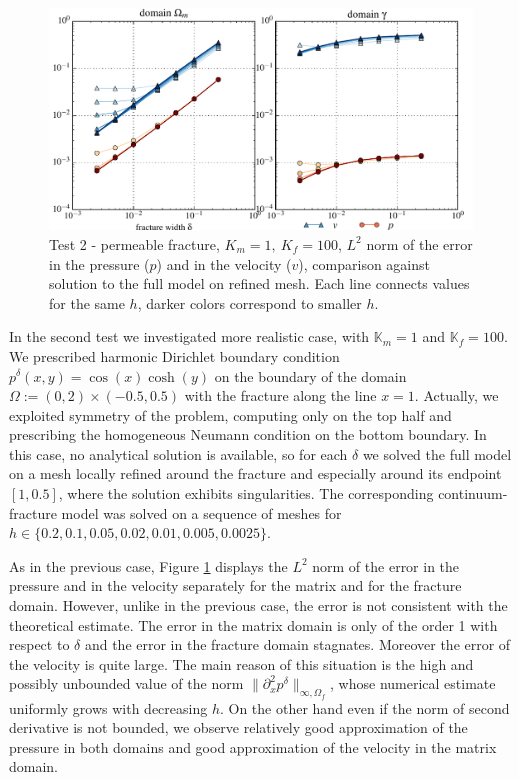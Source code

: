 \documentclass{llncs}
\def\prtl{\partial}
\def\tn#1{{\mathbb{#1}}}    %
\def\norm#1{\|#1\|}
\begin{document}
\begin{figure}
\centering
\includegraphics[scale=0.6]{figures/plot_num_cos_cosh_color.pdf}
\caption{Test 2 - permeable fracture, $K_m=1,\ K_f=100$, $L^2$ norm of the error in the pressure ($p$) and in the velocity ($v$), 
         comparison against solution to the full model on refined mesh.
         Each line connects values for the same $h$, darker colors correspond to smaller $h$.}
\label{fig:cos_cosh}
\end{figure}


In the second test we investigated more realistic case, with $\tn K_m=1$ and $\tn K_f=100$. We prescribed harmonic Dirichlet boundary condition 
$p^\delta(x,y) = \cos(x)\cosh(y)$ on the boundary of the domain $\Omega:=(0,2)\times(-0.5,0.5)$ with the fracture along the line $x=1$.
Actually, we exploited symmetry of the problem, computing only on the top half and prescribing the homogeneous 
Neumann condition on the bottom boundary. In this case, no analytical solution is available, so for each $\delta$ we solved the full model on a mesh locally refined 
around the fracture and especially around its endpoint $[1, 0.5]$, where the solution exhibits singularities. The corresponding continuum-fracture model was solved 
on a sequence of meshes for $h\in\{0.2, 0.1, 0.05, 0.02, 0.01, 0.005, 0.0025\}$.

As in the previous case, Figure \ref{fig:cos_cosh} displays the $L^2$ norm of the error in the pressure and in the velocity separately for 
the matrix and for the fracture domain. However, unlike in the previous case, the error is not consistent with the theoretical estimate. 
The error in the matrix domain is only of the order 1 with respect to $\delta$ and the error in the fracture domain stagnates. Moreover 
the error of the velocity is quite large. The main reason of this situation is the high and possibly unbounded value of the norm $\norm{\prtl^2_x p^\delta}_{\infty,\Omega_f}$,
whose numerical estimate uniformly grows with decreasing $h$.
On the other hand even if the norm of second derivative is not bounded, we observe relatively good approximation of the pressure in both domains
and good approximation of the velocity in the matrix domain.
\end{document}
